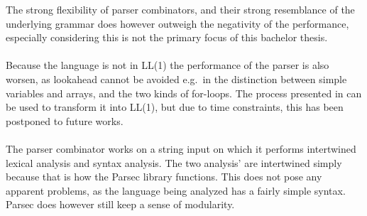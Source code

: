 The strong flexibility of parser combinators, and their strong resemblance of the underlying
grammar does however outweigh the negativity of the performance, especially considering this is
not the primary focus of this bachelor thesis.
\\
\\
Because the language is not in LL(1) the performance of the parser is also worsen, as lookahead
cannot be avoided e.g.\ in the distinction between simple variables and arrays, and the two
kinds of for-loops. The process presented in \cite{torben} can be used to transform it into
LL(1), but due to time constraints, this has been postponed to future works.
\\
\\
The parser combinator works on a string input on which it performs intertwined lexical analysis
and syntax analysis. The two analysis' are intertwined simply because that is how the Parsec
library functions. This does not pose any apparent problems, as the language being analyzed has
a fairly simple syntax. Parsec does however still keep a sense of modularity.

